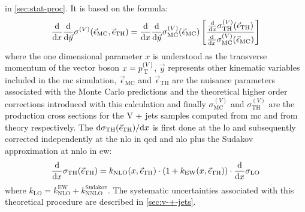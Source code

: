 in \cref{sec:stat-proc}. It is based on the formula:
\begin{equation}
  \label{eq:51}
  \frac{\mathrm{d}}{\mathrm{d} x} \frac{\mathrm{d}}{\mathrm{d} \vec{y}} \sigma^{(V)}
  (\vec{\epsilon}_\mathrm{MC}, \vec{\epsilon}_\mathrm{TH}) = \frac{\mathrm{d}}{\mathrm{d} x}
  \frac{\mathrm{d}}{\mathrm{d} \vec{y}} \sigma_\mathrm{MC}^{(V)}(\vec{\epsilon}_\mathrm{MC})
  \left[ \frac{\frac{\mathrm{d}}{\mathrm{d} x}
      \sigma_\mathrm{TH}^{(V)}(\vec{\epsilon}_\mathrm{TH})}{\frac{\mathrm{d}}{\mathrm{d} x}
      \sigma_\mathrm{MC}^{(V)}(\vec{\epsilon}_\mathrm{MC})} \right]
\end{equation}
where the one dimensional parameter $x$ is understood as the transverse momentum
of the vector boson $x = p_\mathrm{\, T}^{(V)}$, $\vec{y}$ represents other kinematic
variables included in the \gls{mc} simulation, $\vec{\epsilon}_\mathrm{MC}$ and
$\vec{\epsilon}_\mathrm{TH}$ are the nuisance parameters associated with the
Monte Carlo predictions and the theoretical higher order corrections introduced
with this calculation and finally $\sigma_\mathrm{MC}^{(V)}$ and
$\sigma_\mathrm{TH}^{(V)}$ are the production cross sections for the V + jets
samples computed from \gls{mc} and from theory respectively. The
$\mathrm{d} \sigma_\mathrm{TH}(\vec{\epsilon}_\mathrm{TH})/\mathrm{d} x$ is first done at the
\gls{lo} and subsequently corrected independently at the \gls{nlo} in \gls{qcd}
and \gls{nlo} plus the Sudakov approximation at \gls{nnlo} in \gls{ew}:
\begin{equation}
  \label{eq:176}
  \frac{\mathrm{d}}{\mathrm{d} x} \sigma_\mathrm{TH}(\vec{\epsilon}_\mathrm{TH}) =
  k_\mathrm{NLO}(x, \vec{\epsilon}_\mathrm{TH}) \cdot \left(1 + k_\mathrm{EW}(x,
    \vec{\epsilon}_\mathrm{TH}) \right) \cdot \frac{\mathrm{d}}{\mathrm{d} x} \sigma_\mathrm{LO}
\end{equation}
where $k_\mathrm{LO} = k_\mathrm{NLO}^\mathrm{EW} +
k_\mathrm{NNLO}^\mathrm{Sudakov}$. The systematic uncertainties associated with
this theoretical procedure are described in \cref{sec:v-+-jets}.
